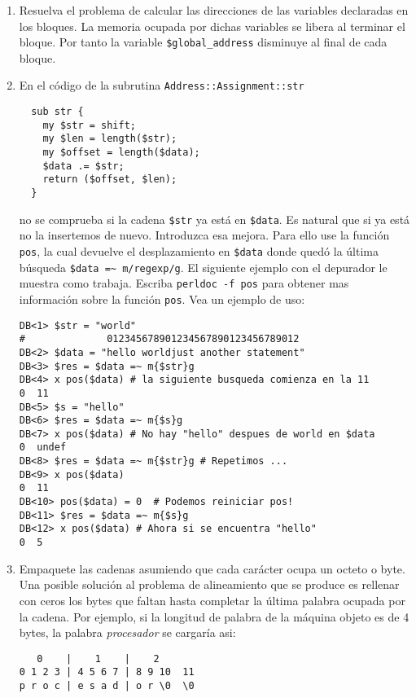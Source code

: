 \begin{enumerate}
\item
Resuelva el problema de calcular las direcciones de las variables
declaradas en los bloques. La memoria ocupada por dichas variables
se libera al terminar el bloque. Por tanto la variable \verb|$global_address|
disminuye al final de cada bloque.
\item
\label{item:norepetidas}
En el código de la subrutina \verb|Address::Assignment::str| 

\begin{verbatim}
  sub str {
    my $str = shift;
    my $len = length($str);
    my $offset = length($data);
    $data .= $str;
    return ($offset, $len);
  }
\end{verbatim}

no se comprueba si la cadena \verb|$str| ya está en \verb|$data|. 
Es natural que si ya está no la insertemos de nuevo. Introduzca esa 
mejora. Para ello use la función \verb|pos|,
la cual devuelve el desplazamiento en \verb|$data| donde
quedó la última búsqueda \verb|$data =~ m/regexp/g|.
 El siguiente ejemplo con
el depurador le muestra como trabaja. Escriba \verb|perldoc -f pos|
para obtener mas información sobre la función \verb|pos|.
Vea un ejemplo de uso:

\begin{verbatim}
DB<1> $str = "world"
#              012345678901234567890123456789012
DB<2> $data = "hello worldjust another statement"
DB<3> $res = $data =~ m{$str}g
DB<4> x pos($data) # la siguiente busqueda comienza en la 11
0  11
DB<5> $s = "hello"
DB<6> $res = $data =~ m{$s}g
DB<7> x pos($data) # No hay "hello" despues de world en $data
0  undef
DB<8> $res = $data =~ m{$str}g # Repetimos ...
DB<9> x pos($data)
0  11
DB<10> pos($data) = 0  # Podemos reiniciar pos!
DB<11> $res = $data =~ m{$s}g
DB<12> x pos($data) # Ahora si se encuentra "hello"
0  5
\end{verbatim}

\item
\label{item:compacta}
Empaquete las cadenas asumiendo que cada carácter ocupa un octeto o byte.
Una posible solución al problema de alineamiento que se produce es
rellenar con ceros los bytes que faltan hasta completar la última palabra
ocupada por la cadena. Por ejemplo, si la longitud de palabra de la 
máquina objeto es de 4 
bytes, la palabra \emph{procesador} se cargaría asi:

\begin{center}
\begin{verbatim}
   0    |    1    |    2      
0 1 2 3 | 4 5 6 7 | 8 9 10  11
p r o c | e s a d | o r \0  \0
\end{verbatim}
\end{center}



\end{enumerate}
